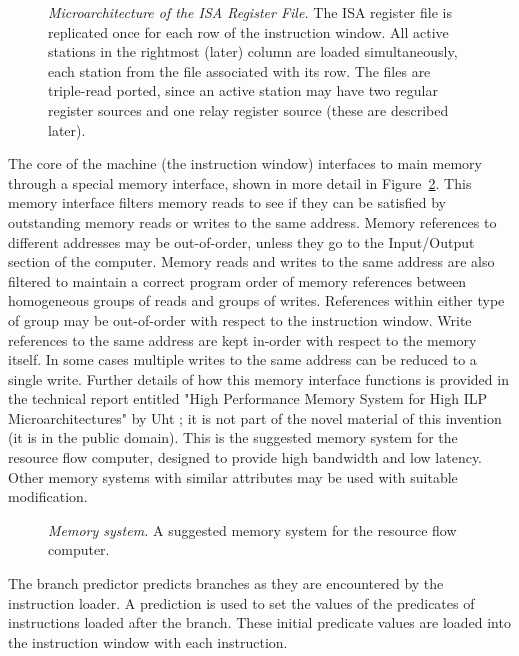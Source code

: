 \documentclass[10pt,dvips]{article}
\begin{document}
\begin{figure}
\centering
{}
\caption{{\em Microarchitecture of the ISA Register File.} The ISA register file is
replicated once for each row of the instruction window. All active stations in the
rightmost (later) column are loaded simultaneously, each station from the file
associated with its row. The files are triple-read ported, since an active station
may have two regular register sources and one relay register source (these are
described later).}
\label{isaregisters}
\end{figure}

The core of the machine (the instruction window) interfaces to
main memory through a special memory interface, shown in more
detail in Figure~\ref{memory}.  This memory interface filters memory
reads to see if they can be satisfied by outstanding memory
reads or writes to the same address.  Memory references to different
addresses may be out-of-order, unless they go to the Input/Output
section of the computer. Memory reads and writes to the same address
are also filtered to maintain a correct program order of memory
references between homogeneous groups of reads and groups of writes.
References within either type of group may be out-of-order with
respect to the instruction
window. Write references to the same address are kept in-order with respect to
the memory itself. In some cases multiple writes to the same address can be
reduced to a single write. Further details of how this memory interface
functions is provided in the technical report entitled
"High Performance Memory System for High ILP Microarchitectures"
by Uht \cite{Uht97e}; it is not part of the novel material of this invention
(it is in the public domain).
This is the suggested memory system for the
resource flow computer,
designed to provide high bandwidth and low latency. Other memory
systems with similar attributes may be used with suitable modification.

\begin{figure}
\centering
{}
\caption{{\em Memory system.} A suggested memory system for the resource flow
computer.}
\label{memory}
\end{figure}

The branch predictor predicts branches as they are encountered by the instruction
loader. A prediction is used to set the values of the predicates of instructions
loaded after the branch. These initial predicate values are loaded into the
instruction window with each instruction.
\end{document}
